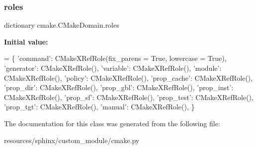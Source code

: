 \subsubsection{\texorpdfstring{roles}{roles}}
{\footnotesize\ttfamily dictionary cmake.\+C\+Make\+Domain.\+roles\hspace{0.3cm}{\ttfamily [static]}}

{\bfseries Initial value\+:}
\begin{DoxyCode}
=  \{
        \textcolor{stringliteral}{'command'}:    CMakeXRefRole(fix\_parens = \textcolor{keyword}{True}, lowercase = \textcolor{keyword}{True}),
        \textcolor{stringliteral}{'generator'}:  CMakeXRefRole(),
        \textcolor{stringliteral}{'variable'}:   CMakeXRefRole(),
        \textcolor{stringliteral}{'module'}:     CMakeXRefRole(),
        \textcolor{stringliteral}{'policy'}:     CMakeXRefRole(),
        \textcolor{stringliteral}{'prop\_cache'}: CMakeXRefRole(),
        \textcolor{stringliteral}{'prop\_dir'}:   CMakeXRefRole(),
        \textcolor{stringliteral}{'prop\_gbl'}:   CMakeXRefRole(),
        \textcolor{stringliteral}{'prop\_inst'}:  CMakeXRefRole(),
        \textcolor{stringliteral}{'prop\_sf'}:    CMakeXRefRole(),
        \textcolor{stringliteral}{'prop\_test'}:  CMakeXRefRole(),
        \textcolor{stringliteral}{'prop\_tgt'}:   CMakeXRefRole(),
        \textcolor{stringliteral}{'manual'}:     CMakeXRefRole(),
    \}
\end{DoxyCode}


The documentation for this class was generated from the following file\+:\begin{DoxyCompactItemize}
\item 
resources/sphinx/custom\+\_\+module/cmake.\+py\end{DoxyCompactItemize}
